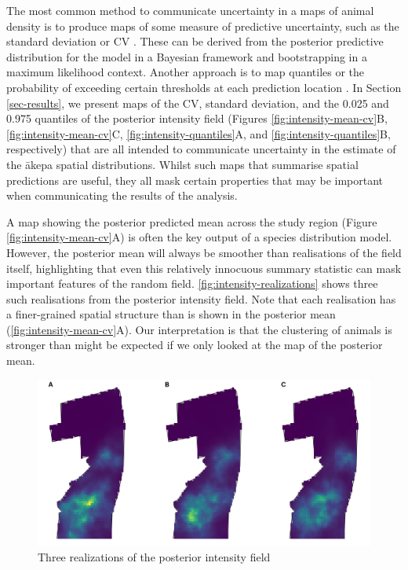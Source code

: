 \documentclass{stylefile16/statsoc}
\newcommand{\akepa}{\textquotesingle\={a}kepa}  %
\begin{document}
The most common method to communicate uncertainty in a maps of animal density is to produce maps of some measure of predictive uncertainty, such as the standard deviation or CV \citep{fuller_novel_2018, vallejo_responses_2017,bradbury_mapping_2014}.  These can be derived from the posterior predictive distribution for the model in a Bayesian framework and bootstrapping in a maximum likelihood context.  Another approach is to map quantiles or the probability of exceeding certain thresholds at each prediction location \citep{russell_avoidance_2016, wilson_hierarchical_2010}.  In Section \ref{sec-results}, we present maps of the CV, standard deviation, and the 0.025 and 0.975 quantiles of the posterior intensity field (Figures \ref{fig:intensity-mean-cv}B, \ref{fig:intensity-mean-cv}C, \ref{fig:intensity-quantiles}A, and \ref{fig:intensity-quantiles}B, respectively) that are all intended to communicate uncertainty in the estimate of the \akepa{} spatial distributions.  Whilst such maps that summarise spatial predictions are useful, they all mask certain properties that may be important when communicating the results of the analysis. 

A map showing the posterior predicted mean across the study region (Figure \ref{fig:intensity-mean-cv}A) is often the key output of a species distribution model.  However, the posterior mean will always be smoother than realisations of the field itself, highlighting that even this relatively innocuous summary statistic can mask important features of the random field.  \autoref{fig:intensity-realizations} shows three such realisations from the posterior intensity field.  Note that each realisation has a finer-grained spatial structure than is shown in the posterior mean (\autoref{fig:intensity-mean-cv}A).  Our interpretation is that the clustering of animals is stronger than might be expected if we only looked at the map of the posterior mean.
\begin{figure}[!htb]
	\includegraphics[scale=0.525]{figures/intensity_realized.png}
	\caption{Three realizations of the posterior intensity field}
	\label{fig:intensity-realizations}
\end{figure}
\end{document}
